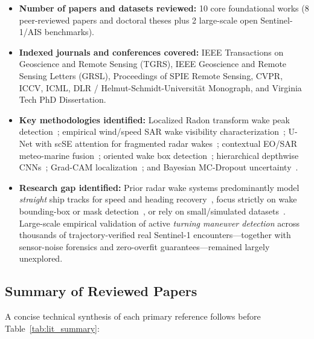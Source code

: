 \documentclass[11pt,a4paper]{article}
\begin{document}
\begin{itemize}[leftmargin=1.5em]
    \item \textbf{Number of papers and datasets reviewed:} 10 core foundational works (8 peer-reviewed papers and doctoral theses plus 2 large-scale open Sentinel-1/AIS benchmarks).
    \item \textbf{Indexed journals and conferences covered:} IEEE Transactions on Geoscience and Remote Sensing (TGRS), IEEE Geoscience and Remote Sensing Letters (GRSL), Proceedings of SPIE Remote Sensing, CVPR, ICCV, ICML, DLR / Helmut-Schmidt-Universit\"at Monograph, and Virginia Tech PhD Dissertation.
    \item \textbf{Key methodologies identified:} Localized Radon transform wake peak detection~\cite{graziano2016ship}; empirical wind/speed SAR wake visibility characterization~\cite{tings2024erkennung}; U-Net with scSE attention for fragmented radar wakes~\cite{zhang2023wakenet}; contextual EO/SAR meteo-marine fusion~\cite{mazzeo2024spie_ueikap}; oriented wake box detection~\cite{xu2024opensarwake}; hierarchical depthwise CNNs~\cite{liu2022convnext}; Grad-CAM localization~\cite{selvaraj2017gradcam}; and Bayesian MC-Dropout uncertainty~\cite{gal2016dropout}.
    \item \textbf{Research gap identified:} Prior radar wake systems predominantly model \textit{straight} ship tracks for speed and heading recovery~\cite{graziano2016ship}, focus strictly on wake bounding-box or mask detection~\cite{zhang2023wakenet,xu2024opensarwake}, or rely on small/simulated datasets~\cite{mazzeo2026ueikap,higgins2023machine}. Large-scale empirical validation of active \textit{turning maneuver detection} across thousands of trajectory-verified real Sentinel-1 encounters---together with sensor-noise forensics and zero-overfit guarantees---remained largely unexplored.
\end{itemize}

\subsection{Summary of Reviewed Papers}

A concise technical synthesis of each primary reference follows before Table~\ref{tab:lit_summary}:
\end{document}
